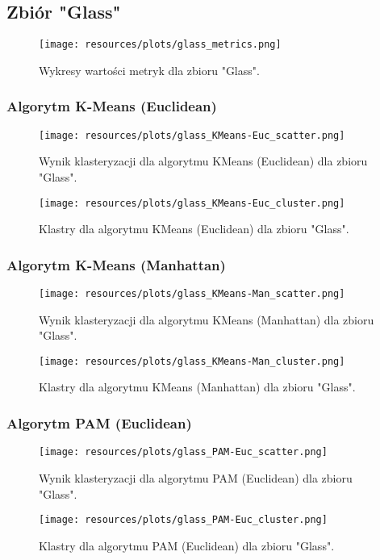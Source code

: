 \subsection{Zbiór "Glass"}
  \begin{figure}[H]
    \center
    \texttt{[image: resources/plots/glass\_metrics.png]}
    \caption{Wykresy wartości metryk dla zbioru "Glass".}
  \end{figure}

  

  \subsubsection{Algorytm K-Means (Euclidean)} 
    \begin{figure}[H]
      \center
      \texttt{[image: resources/plots/glass\_KMeans-Euc\_scatter.png]}
      \caption{Wynik klasteryzacji dla algorytmu KMeans (Euclidean) dla zbioru "Glass".}
    \end{figure}
    \begin{figure}[H]
      \center
      \texttt{[image: resources/plots/glass\_KMeans-Euc\_cluster.png]}
      \caption{Klastry dla algorytmu KMeans (Euclidean) dla zbioru "Glass".}
    \end{figure}

  \subsubsection{Algorytm K-Means (Manhattan)} 
    \begin{figure}[H]
      \center
      \texttt{[image: resources/plots/glass\_KMeans-Man\_scatter.png]}
      \caption{Wynik klasteryzacji dla algorytmu KMeans (Manhattan) dla zbioru "Glass".}
    \end{figure}
    \begin{figure}[H]
      \center
      \texttt{[image: resources/plots/glass\_KMeans-Man\_cluster.png]}
      \caption{Klastry dla algorytmu KMeans (Manhattan) dla zbioru "Glass".}
    \end{figure}

  \subsubsection{Algorytm PAM (Euclidean)} 
    \begin{figure}[H]
      \center
      \texttt{[image: resources/plots/glass\_PAM-Euc\_scatter.png]}
      \caption{Wynik klasteryzacji dla algorytmu PAM (Euclidean) dla zbioru "Glass".}
    \end{figure}
    \begin{figure}[H]
      \center
      \texttt{[image: resources/plots/glass\_PAM-Euc\_cluster.png]}
      \caption{Klastry dla algorytmu PAM (Euclidean) dla zbioru "Glass".}
    \end{figure}

